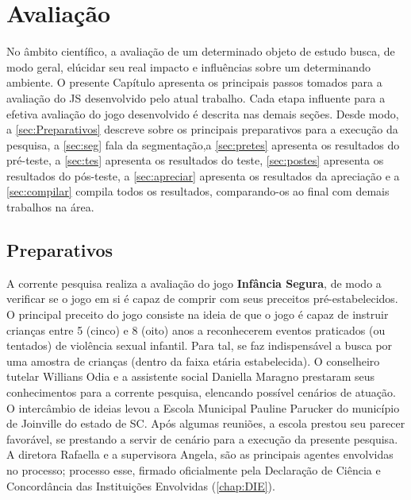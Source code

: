 \chapter{Avaliação}\label{ch:Avaliacao}

No âmbito científico, a avaliação de um determinado objeto de estudo busca, de modo geral, elúcidar seu real impacto e influências sobre um determinando ambiente. O presente Capítulo apresenta os principais passos tomados para a avaliação do \ac{JS} desenvolvido pelo atual trabalho. Cada etapa influente para a efetiva avaliação do jogo desenvolvido é descrita nas demais seções. Desde modo, a \autoref{sec:Preparativos} descreve sobre os principais preparativos para a execução da pesquisa, a \autoref{sec:seg} fala da segmentação,a \autoref{sec:pretes} apresenta os resultados do pré-teste, a \autoref{sec:tes} apresenta os resultados do teste, \autoref{sec:postes} apresenta os resultados do pós-teste, a \autoref{sec:apreciar} apresenta os resultados da apreciação e a \autoref{sec:compilar} compila todos os resultados, comparando-os ao final com demais trabalhos na área. 

\section{Preparativos}\label{sec:Preparativos}

A corrente pesquisa realiza a avaliação do jogo \textbf{Infância Segura}, de modo a verificar se o jogo em si é capaz de comprir com seus preceitos pré-estabelecidos. O principal preceito do jogo consiste na ideia de que o jogo é capaz de instruir crianças entre 5 (cinco) e 8 (oito) anos a reconhecerem eventos praticados (ou tentados) de violência sexual infantil. Para tal, se faz indispensável a busca por uma amostra de crianças (dentro da faixa etária estabelecida). O conselheiro tutelar Willians Odia e a assistente social Daniella Maragno prestaram seus conhecimentos para a corrente pesquisa, elencando possível cenários de atuação. O intercâmbio de ideias levou a Escola Municipal Pauline Parucker do município de Joinville do estado de \ac{SC}. Após algumas reuniões, a escola prestou seu parecer favorável, se prestando a servir de cenário para a execução da presente pesquisa. A diretora Rafaella e a supervisora Angela, são as principais agentes envolvidas no processo; processo esse, firmado oficialmente pela Declaração de Ciência e Concordância das Instituições Envolvidas (\autoref{chap:DIE}). 


